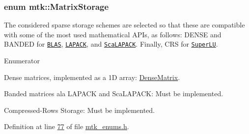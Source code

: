 \hypertarget{group__c02-enums_ga25b67ec6a2afeee69f9bb196a9c66619}{
\subsubsection[{Matrix\-Storage}]{\setlength{\rightskip}{0pt plus 5cm}enum {\bf mtk\-::\-Matrix\-Storage}}}\label{group__c02-enums_ga25b67ec6a2afeee69f9bb196a9c66619}
The considered sparse storage schemes are selected so that these are compatible with some of the most used mathematical A\-P\-Is, as follows\-: D\-E\-N\-S\-E and B\-A\-N\-D\-E\-D for \href{http://www.netlib.org/blas/}{\tt B\-L\-A\-S}, \href{http://www.netlib.org/lapack/}{\tt L\-A\-P\-A\-C\-K}, and \href{http://www.netlib.org/scalapack/}{\tt Sca\-L\-A\-P\-A\-C\-K}. Finally, C\-R\-S for \href{http://crd.lbl.gov/~xiaoye/SuperLU/}{\tt Super\-L\-U}. \begin{Desc}
\item[Enumerator]\par
\begin{description}
\item[{\em 
\hypertarget{group__c02-enums_ga25b67ec6a2afeee69f9bb196a9c66619a00a806d43a7d74e9ccca47a2134e9c87}{D\-E\-N\-S\-E}\label{group__c02-enums_ga25b67ec6a2afeee69f9bb196a9c66619a00a806d43a7d74e9ccca47a2134e9c87}
}]Dense matrices, implemented as a 1\-D array\-: \hyperlink{classmtk_1_1DenseMatrix}{Dense\-Matrix}. \item[{\em 
\hypertarget{group__c02-enums_ga25b67ec6a2afeee69f9bb196a9c66619aef1d4271d5005282978a3a40a8a52c9b}{B\-A\-N\-D\-E\-D}\label{group__c02-enums_ga25b67ec6a2afeee69f9bb196a9c66619aef1d4271d5005282978a3a40a8a52c9b}
}]Banded matrices ala L\-A\-P\-A\-C\-K and Sca\-L\-A\-P\-A\-C\-K\-: Must be implemented. \item[{\em 
\hypertarget{group__c02-enums_ga25b67ec6a2afeee69f9bb196a9c66619a87619d374775e937bca967402b988b8b}{C\-R\-S}\label{group__c02-enums_ga25b67ec6a2afeee69f9bb196a9c66619a87619d374775e937bca967402b988b8b}
}]Compressed-\/\-Rows Storage\-: Must be implemented. \end{description}
\end{Desc}


Definition at line \hyperlink{mtk__enums_8h_source_l00077}{77} of file \hyperlink{mtk__enums_8h_source}{mtk\-\_\-enums.\-h}.

